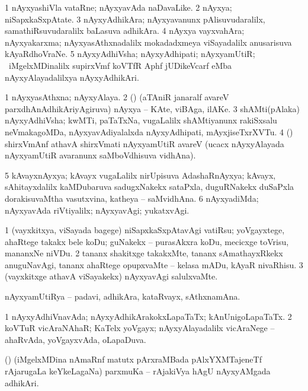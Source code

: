 \bentry
{}
\gl{\nA}
\bmng
\bnum
\num{1} nAyxyashiVla vataRne; nAyxyavAda naDavaLike. 
\num{2} nAyxya; niSapxkaSxpAtate. 
\num{3} nAyxyAdhikAra; nAyxyavanunx pAlisuvudaralilx, samathiRsuvudaralilx baLasuva adhikAra. 
\num{4} nAyxya vayxvahAra; nAyxyakarxma; nAyxyasAthxnadalilx mokadadxmeya viSayadalilx anusarisuva kAyaRdhoVraNe. 
\num{5} nAyxyAdhiVsha; nAyxyAdhipati; nAyxyamUtiR; \kanmu\ iMgelxMDinalilx supirxVmf koVTfR Aphf jUDikeVcarf eMba nAyxyAlayadalilxya nAyxyAdhikAri. 
\enum
\emng

\noindent
\gl{\pagu}
\bmng
\bnum
\num{1}  nAyxyasAthxna; nAyxyAlaya. 
\num{2}  (\ame) (aTAniR janaralf avareV parxdhAnAdhikAriyAgiruva) nAyxya -- KAte, viBAga, ilAKe. 
\num{3}  shAMti(pAlaka) nAyxyAdhiVsha; kwMTi, paTaTxNa, \mo vugaLalilx shAMtiyanunx rakiSxsalu neVmakagoMDa, nAyxyavAdiyalalxda nAyxyAdhipati, mAyxjiseTxrXVTu. 
\num{4}  (\birx) shirxVmAnf athavA shirxVmati nAyxyamUtiR avareV (ucacx nAyxyAlayada nAyxyamUtiR avaranunx saMboVdhisuva vidhAna). 
\num{5}  kAvayxnAyxya; kAvayx \mo vugaLalilx nirUpisuva AdashaRnAyxya; kAvayx, sAhitayxdalilx kaMDubaruva sadugxNakekx sataPxla, duguRNakekx duSaPxla dorakisuvaMtha vasutxvina, katheya -- saMvidhAna. 
\num{6}  nAyxyadiMda; nAyxyavAda riVtiyalilx; nAyxyavAgi; yukatxvAgi. 
\enum
\emng

\noindent
\gl{\nuga}
\bmng
\bnum
\num{1}  (vayxkitxya, viSayada bagege) niSapxkaSxpAtavAgi vatiRsu; yoVgayxtege, ahaRtege takakx bele koDu; guNakekx -- purasAkxra koDu, mecicxge toVrisu, mananxNe niVDu. 
\num{2}  tananx shakitxge takakxMte, tananx sAmathayxRkekx anuguNavAgi, tananx ahaRtege opupxvaMte -- kelasa mADu, kAyaR nivaRhisu. 
\num{3}  (vayxkitxge athavA viSayakekx) nAyxyavAgi salulxvaMte. 
\enum
\emng
\eentry

\bentry
{}
\gl{\nA}
\bmng
nAyxyamUtiRya -- padavi, adhikAra, kataRvayx, sAthxnamAna. 
\emng
\eentry

\bentry
{}
\gl{\gu}
\bmng
\bnum
\num{1} nAyxyAdhiVnavAda; nAyxyAdhikArakokxLapaTaTx; kAnUnigoLapaTaTx. 
\num{2} koVTuR vicAraNAhaR; KaTelx yoVgayx; nAyxyAlayadalilx vicAraNege -- ahaRvAda, yoVgayxvAda, oLapaDuva. 
\enum
\emng
\eentry

\bentry
{}
\gl{\nA}
\bmng
(\ca) (iMgelxMDina nAmaRnf matutx pArxraMBada pAlxYXMTajeneTf rAjarugaLa keYkeLagaNa) parxmuKa -- rAjakiVya hAgU nAyxyAMgada adhikAri. 
\emng
\eentry

